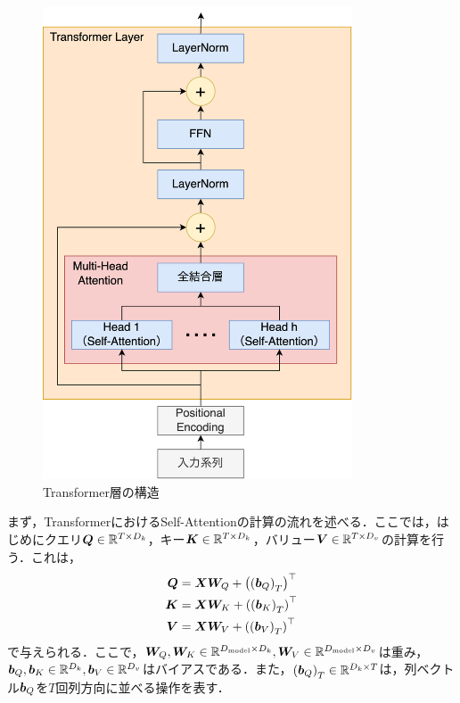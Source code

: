 \begin{figure}[bt]
    \centering
    \includegraphics[height=140mm]{./figure/sec3/transformer.drawio.png}
    \caption{Transformer層の構造}
    \label{sec3:fig:transformer_layer}
\end{figure}

まず，TransformerにおけるSelf-Attentionの計算の流れを述べる．ここでは，はじめにクエリ$\bm{Q} \in \mathbb{R}^{T \times D_{k}}$，キー$\bm{K} \in \mathbb{R}^{T \times D_{k}}$，バリュー$\bm{V} \in \mathbb{R}^{T \times D_{v}}$の計算を行う．これは，
\begin{align}
    \bm{Q} & = \bm{X}\bm{W}_{Q} + \left(\left(\bm{b}_{Q}\right)_{T}\right)^\top \\
    \bm{K} & = \bm{X}\bm{W}_{K} + \left(\left(\bm{b}_{K}\right)_{T}\right)^\top \\
    \bm{V} & = \bm{X}\bm{W}_{V} + \left(\left(\bm{b}_{V}\right)_{T}\right)^\top
\end{align}
で与えられる．ここで，$\bm{W}_{Q}, \bm{W}_{K} \in \mathbb{R}^{D_{\text{model}} \times D_{k}}, \bm{W}_{V} \in \mathbb{R}^{D_{\text{model}} \times D_{v}}$は重み，$\bm{b}_{Q}, \bm{b}_{K} \in \mathbb{R}^{D_{k}}, \bm{b}_{V} \in \mathbb{R}^{D_{v}}$はバイアスである．また，$\left(\bm{b}_{Q}\right)_{T} \in \mathbb{R}^{D_{k} \times T}$は，列ベクトル$\bm{b}_{Q}$を$T$回列方向に並べる操作を表す．

